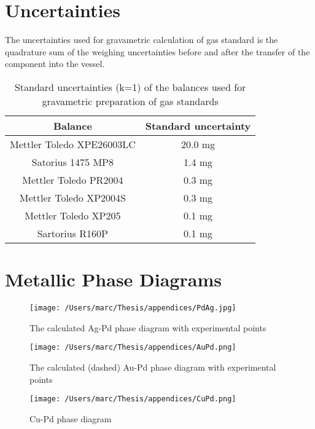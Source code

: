 %

\chapter{Uncertainties}
The uncertainties used for gravametric calculation of gas standard is the quadrature sum of the weighing uncertainties before and after the transfer of the component into the vessel.
\begin{table}[H]
    \centering
    \begin{tabular}{@{}cc@{}}
    \toprule
    Balance                   & Standard uncertainty \\ \midrule
    Mettler Toledo XPE26003LC & 20.0 mg                \\
    Satorius 1475 MP8         & 1.4 mg               \\
    Mettler Toledo PR2004     & 0.3 mg               \\
    Mettler Toledo XP2004S    & 0.3 mg               \\
    Mettler Toledo XP205      & 0.1 mg               \\
    Sartorius R160P           & 0.1 mg               \\ \bottomrule
    \end{tabular}
    \caption{Standard uncertainties (k=1) of the balances used for gravametric preparation of gas standards}
\end{table}

\chapter{Metallic Phase Diagrams}
\begin{figure}[H]
  \texttt{[image: /Users/marc/Thesis/appendices/PdAg.jpg]}
  \caption{The calculated Ag-Pd phase diagram with experimental points \cite{Ghosh1999}}
\end{figure}

\begin{figure}[H]
  \texttt{[image: /Users/marc/Thesis/appendices/AuPd.png]}
  \caption{The calculated (dashed) Au-Pd phase diagram with experimental points \cite{Sluiter2006}}
\end{figure}

\begin{figure}[H]
  \texttt{[image: /Users/marc/Thesis/appendices/CuPd.png]}
  \caption{Cu-Pd phase diagram }
\end{figure}

